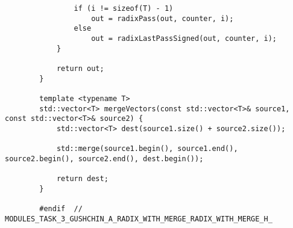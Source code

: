 \documentclass{report}
\begin{document}
\begin{lstlisting}
                if (i != sizeof(T) - 1)
                    out = radixPass(out, counter, i);
                else
                    out = radixLastPassSigned(out, counter, i);
            }
        
            return out;
        }
        
        template <typename T>
        std::vector<T> mergeVectors(const std::vector<T>& source1, const std::vector<T>& source2) {
            std::vector<T> dest(source1.size() + source2.size());
        
            std::merge(source1.begin(), source1.end(), source2.begin(), source2.end(), dest.begin());
        
            return dest;
        }
        
        #endif  // MODULES_TASK_3_GUSHCHIN_A_RADIX_WITH_MERGE_RADIX_WITH_MERGE_H_
	\end{lstlisting}
\end{document}
